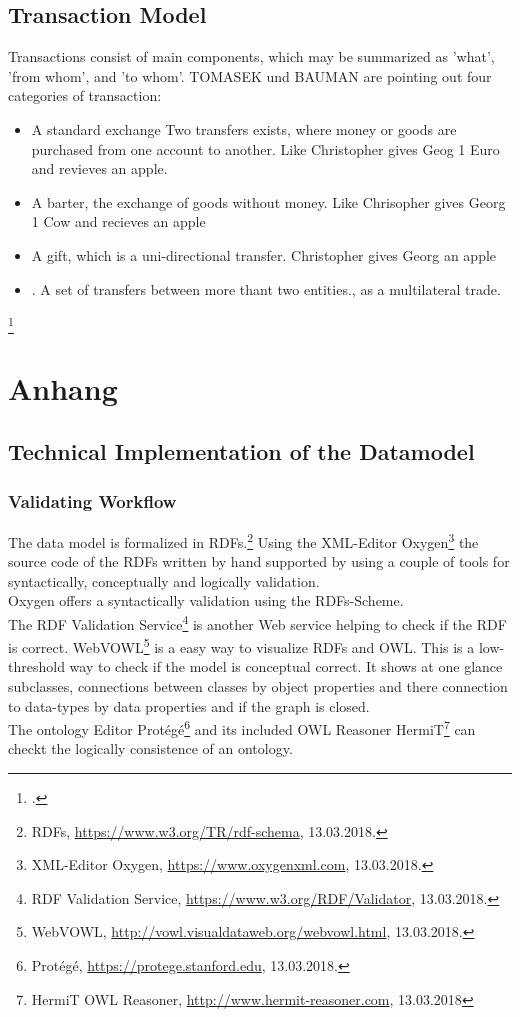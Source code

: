\documentclass[12pt,a4paper]{article}
\begin{document}
\subsection{Transaction Model}
Transactions consist of main
components, which may be summarized as 'what', 'from whom', and 'to whom'.
TOMASEK und BAUMAN are pointing out four categories of transaction:
\begin{itemize}
\item A standard exchange Two transfers exists, where money or goods are purchased from one account to another. Like Christopher gives Geog 1 Euro and revieves an apple.
\item A barter, the exchange of goods without money. Like Chrisopher gives Georg 1 Cow and recieves an apple
\item A gift, which is a uni-directional transfer. Christopher gives Georg an apple
\item. A set of transfers between more thant two entities., as a multilateral trade.
\end{itemize}
\footcite[][p.13-15]{tomasek2013encoding}
\newpage
\section{Anhang}
\label{sec:Anhang}

\subsection{Technical Implementation of the Datamodel}
\label{subsec:ImplementationDatamodel}

\subsubsection{Validating Workflow}
\label{subsec:ValidatingWorkflow}
The data model is formalized in RDFs.\footnote{RDFs, \url{https://www.w3.org/TR/rdf-schema}, 13.03.2018.} Using the XML-Editor Oxygen\footnote{XML-Editor Oxygen, \url{https://www.oxygenxml.com}, 13.03.2018.} the source code of the RDFs written by hand supported by using a couple of tools for syntactically, conceptually and logically validation.
\\
Oxygen offers a syntactically validation using the RDFs-Scheme.\\
The RDF Validation Service\footnote{RDF Validation Service, \url{https://www.w3.org/RDF/Validator}, 13.03.2018.} is another Web service helping to check if the RDF is correct.
WebVOWL\footnote{WebVOWL, \url{http://vowl.visualdataweb.org/webvowl.html}, 13.03.2018.} is a easy way to visualize RDFs and OWL. This is a low-threshold way to check if the model is conceptual correct. It shows at one glance subclasses, connections between classes by object  properties and there connection to data-types by data properties and if the graph is closed.
\\
The ontology Editor 
Protégé\footnote{Protégé, \url{https://protege.stanford.edu}, 13.03.2018.} and its included OWL Reasoner HermiT\footnote{HermiT OWL Reasoner, \url{http://www.hermit-reasoner.com}, 13.03.2018} can checkt the logically consistence of an ontology.
\end{document}
